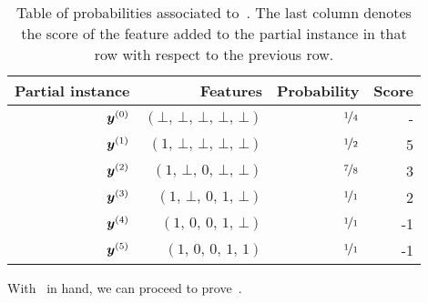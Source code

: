 \begin{example}
\begin{table}
\caption{Table of probabilities associated to~. The last column denotes the score of the feature added to the partial instance in that row with respect to the previous row.}\label{table:ex-greedy1}
\centering
\begin{tabular}{rrrr}
    Partial instance & Features & Probability & Score \\ \midrule 
${\bm{y}}^{(0)}$  & $(\bot, \,\bot, \,\bot, \,\bot, \,\bot)$ & $\nicefrac{ 1 }{ 4 }$ & - \\
${\bm{y}}^{(1)}$  &$(1, \,\bot, \,\bot, \,\bot, \,\bot)$ & $\nicefrac{ 1 }{ 2 }$ & 5\\
${\bm{y}}^{(2)}$  &$(1, \,\bot, \,0, \,\bot, \,\bot)$ & $\nicefrac{ 7 }{ 8 }$ & 3\\
${\bm{y}}^{(3)}$ & $(1, \,\bot, \,0, \,1, \,\bot)$ & $\nicefrac{ 1 }{ 1 }$ & 2 \\
${\bm{y}}^{(4)}$ &$(1, \,0, \,0, \,1, \,\bot)$ & $\nicefrac{ 1 }{ 1 }$ & -1 \\
${\bm{y}}^{(5)}$ & $(1, \,0, \,0, \,1, \,1)$ & $\nicefrac{ 1 }{ 1 }$ & -1\\
\bottomrule
\end{tabular}
\end{table}
\end{example}


With~ in hand, we can proceed to prove~.





